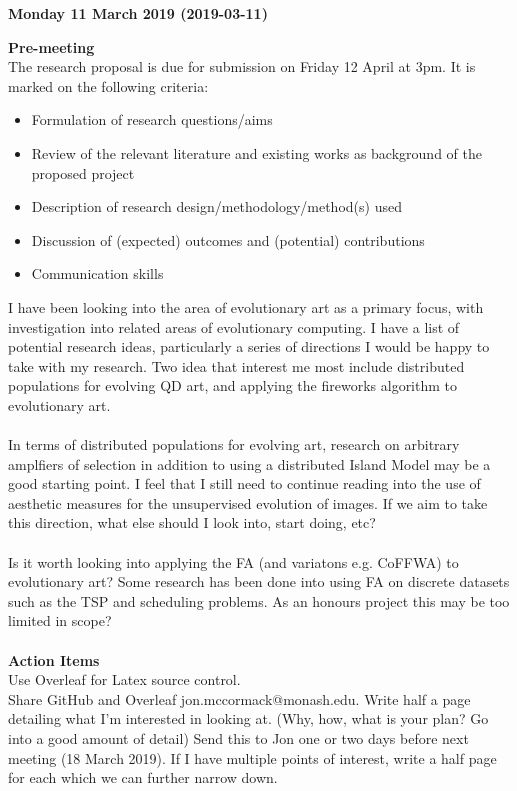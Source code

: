 \documentclass[10pt,a4paper]{article}
\begin{document}
\begin{center} \textbf{Monday 11 March 2019 (2019-03-11)} \end{center} 
\textbf{Pre-meeting}
\\
The research proposal is due for submission on Friday 12 April at 3pm.
It is marked on the following criteria:
\begin{itemize}
	\item Formulation of research questions/aims
	\item Review of the relevant literature and existing works as background of the proposed project
	\item Description of research design/methodology/method(s) used
	\item Discussion of (expected) outcomes and (potential) contributions
	\item Communication skills
\end{itemize}
I have been looking into the area of evolutionary art as a primary focus, with investigation into related areas of evolutionary computing.
I have a list of potential research ideas, particularly a series of directions I would be happy to take with my research.
Two idea that interest me most include distributed populations for evolving QD art, and applying the fireworks algorithm to evolutionary art.
\\\\
In terms of distributed populations for evolving art, research on arbitrary amplfiers of selection \cite{graph-amplifiers} in addition to using a distributed Island Model \cite{distributed-evolutionary-art} may be a good starting point.
I feel that I still need to continue reading into the use of aesthetic measures for the unsupervised evolution of images.
If we aim to take this direction, what else should I look into, start doing, etc?
\\\\
Is it worth looking into applying the FA (and variatons e.g. CoFFWA) to evolutionary art?
Some research has been done into using FA on discrete datasets such as the TSP and scheduling problems.
As an honours project this may be too limited in scope?
\\\\
\textbf{Action Items}
\\
Use Overleaf for Latex source control. \\
Share GitHub and Overleaf jon.mccormack@monash.edu. 
Write half a page detailing what I'm interested in looking at. (Why, how, what is your plan? Go into a good amount of detail)
Send this to Jon one or two days before next meeting (18 March 2019).
If I have multiple points of interest, write a half page for each which we can further narrow down.


\pagebreak



\end{document}
